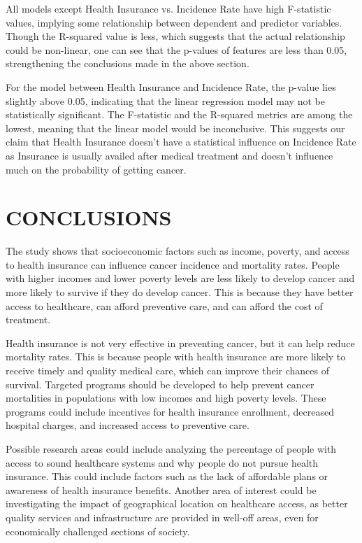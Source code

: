 \documentclass[conference]{IEEEtran}
\begin{document}
All models except Health Insurance vs. Incidence Rate have high F-statistic values, implying some relationship between dependent and predictor variables. Though the R-squared value is less, which suggests that the actual relationship could be non-linear, one can see that the p-values of features are less than 0.05, strengthening the conclusions made in the above section. 

For the model between Health Insurance and Incidence Rate, the p-value lies slightly above 0.05, indicating that the linear regression model may not be statistically significant. The F-statistic and the R-squared metrics are among the lowest, meaning that the linear model would be inconclusive. This suggests our claim that Health Insurance doesn’t have a statistical influence on Incidence Rate as Insurance is usually availed after medical treatment and doesn’t influence much on the probability of getting cancer.

\vspace{1mm} %

\section{CONCLUSIONS}

The study shows that socioeconomic factors such as income, poverty, and access to health insurance can influence cancer incidence and mortality rates. People with higher incomes and lower poverty levels are less likely to develop cancer and more likely to survive if they do develop cancer. This is because they have better access to healthcare, can afford preventive care, and can afford the cost of treatment.

Health insurance is not very effective in preventing cancer, but it can help reduce mortality rates. This is because people with health insurance are more likely to receive timely and quality medical care, which can improve their chances of survival. Targeted programs should be developed to help prevent cancer mortalities in populations with low incomes and high poverty levels. These programs could include incentives for health insurance enrollment, decreased hospital charges, and increased access to preventive care.

Possible research areas could include analyzing the percentage of people with access to sound healthcare systems and why people do not pursue health insurance. This could include factors such as the lack of affordable plans or awareness of health insurance benefits. Another area of interest could be investigating the impact of geographical location on healthcare access, as better quality services and infrastructure are provided in well-off areas, even for economically challenged sections of society.
\end{document}
